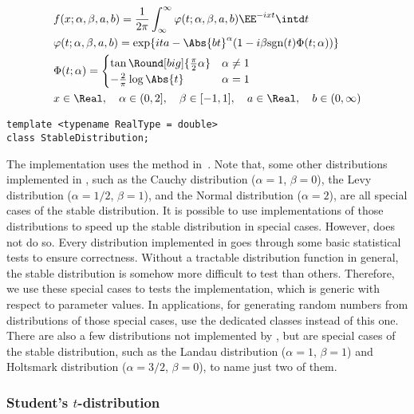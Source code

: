 \begin{align*}
  &f(x;\alpha,\beta,a,b) =
  \frac{1}{2\pi}\int_{\infty}^{\infty}
  \varphi(t;\alpha,\beta,a,b)\EE^{-ixt}\intd t\\
  &\varphi(t;\alpha,\beta,a,b) =
  \exp\{ita - \Abs{bt}^{\alpha}(1 - i\beta\mathrm{sgn}(t)\Phi(t;\alpha))\} \\
  &\Phi(t;\alpha) = \begin{cases}
    \tan\Round[big]{\frac{\pi}{2}\alpha} & \alpha \ne 1 \\
    -\frac{2}{\pi}\log\Abs{t}            & \alpha = 1
  \end{cases} \\
  & x \in \Real,\quad
  \alpha \in (0, 2],\quad \beta \in [-1, 1],\quad
  a \in \Real,\quad b \in (0, \infty)
\end{align*}
\begin{Verbatim}
template <typename RealType = double>
class StableDistribution;
\end{Verbatim}
The implementation uses the method in~\cite{Chambers:1976dv}. Note that, some
other distributions implemented in \mckl, such as the Cauchy distribution
($\alpha = 1$, $\beta = 0$), the Levy distribution ($\alpha = 1/2$, $\beta =
1$), and the Normal distribution ($\alpha = 2$), are all special cases of the
stable distribution. It is possible to use implementations of those
distributions to speed up the stable distribution in special cases. However,
\mckl does not do so. Every distribution implemented in \mckl goes through some
basic statistical tests to ensure correctness. Without a tractable distribution
function in general, the stable distribution is somehow more difficult to test
than others. Therefore, we use these special cases to tests the implementation,
which is generic with respect to parameter values. In applications, for
generating random numbers from distributions of those special cases, use the
dedicated classes instead of this one. There are also a few distributions not
implemented by \mckl, but are special cases of the stable distribution, such as
the Landau distribution ($\alpha = 1$, $\beta = 1$) and Holtsmark distribution
($\alpha = 3/2$, $\beta = 0$), to name just two of them.

\subsubsection{Student's \texorpdfstring{$t$}{t}-distribution}

